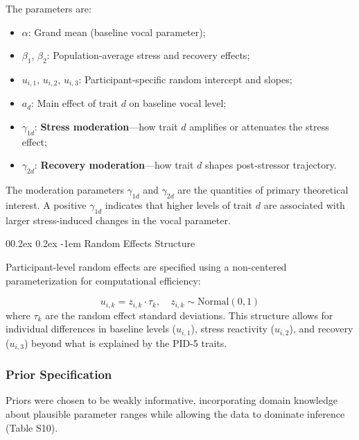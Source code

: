 \documentclass[
  english,
  man,floatsintext]{apa6}
\makeatletter
\let\oldparagraph\paragraph
\renewcommand{\paragraph}{
    \@ifstar
      \xxxParagraphStar
      \xxxParagraphNoStar
  }
\newcommand{\xxxParagraphStar}[1]{\oldparagraph*{#1}\mbox{}}
\newcommand{\xxxParagraphNoStar}[1]{\oldparagraph{#1}\mbox{}}
\providecommand{\tightlist}{%
  \setlength{\itemsep}{0pt}\setlength{\parskip}{0pt}}
\renewcommand{\paragraph}{\@startsection{paragraph}{4}{\parindent}%
  {0\baselineskip \@plus 0.2ex \@minus 0.2ex}%
  {-1em}%
  {\normalfont\normalsize\bfseries\itshape\typesectitle}}
\makeatother
\begin{document}
The parameters are:

\begin{itemize}
\tightlist
\item
  \(\alpha\): Grand mean (baseline vocal parameter);
\item
  \(\beta_1\), \(\beta_2\): Population-average stress and recovery effects;
\item
  \(u_{i,1}\), \(u_{i,2}\), \(u_{i,3}\): Participant-specific random intercept and slopes;
\item
  \(a_d\): Main effect of trait \(d\) on baseline vocal level;
\item
  \(\gamma_{1d}\): \textbf{Stress moderation}---how trait \(d\) amplifies or attenuates the stress effect;
\item
  \(\gamma_{2d}\): \textbf{Recovery moderation}---how trait \(d\) shapes post-stressor trajectory.
\end{itemize}

The moderation parameters \(\gamma_{1d}\) and \(\gamma_{2d}\) are the quantities of primary theoretical interest. A positive \(\gamma_{1d}\) indicates that higher levels of trait \(d\) are associated with larger stress-induced changes in the vocal parameter.

\paragraph{Random Effects Structure}\label{random-effects-structure}

Participant-level random effects are specified using a non-centered parameterization for computational efficiency:

\[
u_{i,k} = z_{i,k} \cdot \tau_k, \quad z_{i,k} \sim \text{Normal}(0, 1)
\]
where \(\tau_k\) are the random effect standard deviations. This structure allows for individual differences in baseline levels (\(u_{i,1}\)), stress reactivity (\(u_{i,2}\)), and recovery (\(u_{i,3}\)) beyond what is explained by the PID-5 traits.

\subsubsection{Prior Specification}\label{prior-specification-1}

Priors were chosen to be weakly informative, incorporating domain knowledge about plausible parameter ranges while allowing the data to dominate inference (Table S10).
\end{document}
